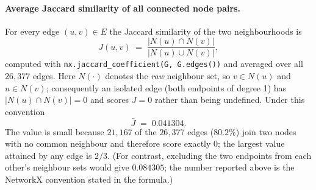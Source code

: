 \paragraph{Average Jaccard similarity of all connected node pairs.}
For every edge $(u,v)\in E$ the Jaccard similarity of the two neighbourhoods is
\[
  J(u,v) \;=\; \frac{\lvert N(u)\cap N(v)\rvert}{\lvert N(u)\cup N(v)\rvert},
\]
computed with \texttt{nx.jaccard\_coefficient(G, G.edges())} and averaged over all
$26{,}377$ edges. Here $N(\cdot)$ denotes the \emph{raw} neighbour set, so
$v\in N(u)$ and $u\in N(v)$; consequently an isolated edge (both endpoints of
degree 1) has $\lvert N(u)\cap N(v)\rvert=0$ and scores $J=0$ rather than being
undefined. Under this convention
\[
  \bar{J} \;=\; 0.041304 .
\]
The value is small because $21{,}167$ of the $26{,}377$ edges ($80.2\%$) join two
nodes with no common neighbour and therefore score exactly $0$; the largest value
attained by any edge is $2/3$. (For contrast, excluding the two endpoints from each
other's neighbour sets would give $0.084305$; the number reported above is the
NetworkX convention stated in the formula.)
